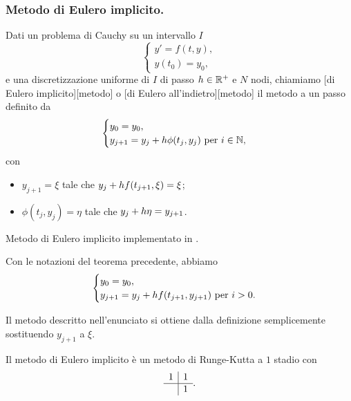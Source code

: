 \subsubsection{Metodo di Eulero implicito.}
\label{MetodiNumericiPerEquazioniDifferenzialiOrdinarie_MetodoDiEuleroImplicito}
\begin{Definition}
	Dati un problema di Cauchy su un intervallo $I$
	\[
	\begin{cases}
		y' = f(t,y),\\
		y(t_0) = y_0,
	\end{cases}
	\]
	e una discretizzazione uniforme di $I$ di passo $h \in \mathbb{R}^+$ e $N$ nodi, chiamiamo [di Eulero implicito][metodo] o [di Eulero all'indietro][metodo] il metodo a un passo definito da
	\[
	\begin{cases}
		y_0 = y_0,\\
		y_{j + 1} = y_j + h \phi(t_j,y_j)\text{ per }i \in \mathbb{N},
	\end{cases}
	\]
	con
	\begin{itemize}
		\item $y_{j + 1} = \xi$ tale che $y_j + h f(t_{j + 1},\xi) = \xi$;
		\item $\phi(t_j,y_j) = \eta$ tale che $y_j + h \eta = y_{j + 1}$.
	\end{itemize}
\end{Definition}
\begin{listing}
	\caption{Metodo di Eulero implicito implementato in .}
\end{listing}
\begin{Theorem}
	Con le notazioni del teorema precedente, abbiamo
	\[
	\begin{cases}
		y_0 = y_0,\\
		y_{j + 1} = y_j + h f(t_{j + 1},y_{j + 1})\text{ per }i > 0.
	\end{cases}
	\]
\end{Theorem}
\Proof Il metodo descritto nell'enunciato si ottiene dalla definizione semplicemente sostituendo $y_{j + 1}$ a $\xi$. \EndProof
\begin{Theorem}
	Il metodo di Eulero implicito \`e un metodo di Runge-Kutta a $1$ stadio con \tableau
	\[
	\begin{array}{c|c}
	1	&	1\\
	\hline
		&	1
	\end{array}.
	\]
\end{Theorem}

